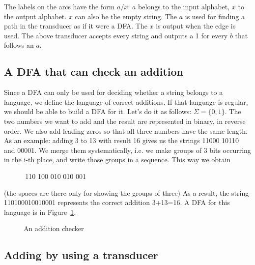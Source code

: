 The labels on the arcs have the form $a/x$: $a$ belongs to the input
alphabet, $x$ to the output alphabet. $x$ can also be the empty
string. The $a$ is used for finding a path in the transducer as if it
were a DFA. The $x$ is output when the edge is used.
The above transducer accepts every string and outputs a 1 for every
$b$ that follows an $a$.



\subsection{A DFA that can check an addition}

Since a DFA can only be used for deciding whether a string belongs to
a language, we define the language of correct additions. If that
language is regular, we should be able to build a DFA for it. Let's do
it as follows: $\Sigma = \{0,1\}$. The two numbers we want to add and
the result are represented in binary, in reverse order. We also add
leading zeros so that all three numbers have the same length. As an
example: adding 3 to 13 with result 16 gives us the strings
11000 10110 and 00001. We merge them systematically, i.e. we make
groups of 3 bits occurring in the i-th place, and write those groups
in a sequence. This way we obtain

$~~~~~~~~~~~~~~$110 100 010 010 001

(the spaces are there only for showing the groups of three)
As a result, the string 110100010010001 represents the correct
addition 3+13=16. A DFA for this language is in Figure~\ref{telop}.


\begin{figure}[h]
\caption{An addition checker \label{telop}}
\end{figure}

\subsection{Adding by using a transducer}

